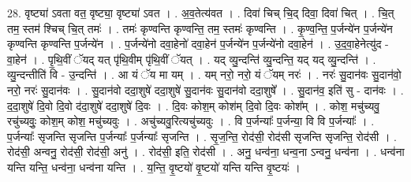 \documentclass[17pt]{extarticle}
\begin{document}
28. वृष्ट्या॑ ऽवता वत॒ वृष्ट्या॒ वृष्ट्या॑ ऽवत । . अ॒व॒तेत्य॑वत । . दिवा॑ चिच् चि॒द् दिवा॒ दिवा॑ चित् । . चि॒त् तम॒ स्तम॑ श्चिच् चि॒त् तमः॑ । . तमः॑ कृण्वन्ति कृण्वन्ति॒ तम॒ स्तमः॑ कृण्वन्ति । . कृ॒ण्व॒न्ति॒ प॒र्जन्ये॑न प॒र्जन्ये॑न कृण्वन्ति कृण्वन्ति प॒र्जन्ये॑न । . प॒र्जन्ये॑नो दवा॒हेनो॑ दवा॒हेन॑ प॒र्जन्ये॑न प॒र्जन्ये॑नो दवा॒हेन॑ । . उ॒द॒वा॒हेनेत्यु॑द - वा॒हेन॑ । . पृ॒थि॒वीं ॅयद् यत् पृ॑थि॒वीम् पृ॑थि॒वीं ॅयत् । . यद् व्यु॒न्दन्ति॑ व्यु॒न्दन्ति॒ यद् यद् व्यु॒न्दन्ति॑ । . व्यु॒न्दन्तीति॑ वि - उ॒न्दन्ति॑ । . आ यं ॅय मा यम् । . यम् नरो॒ नरो॒ यं ॅयम् नरः॑ । . नरः॑ सु॒दान॑वः सु॒दान॑वो॒ नरो॒ नरः॑ सु॒दान॑वः । . सु॒दान॑वो ददा॒शुषे॑ ददा॒शुषे॑ सु॒दान॑वः सु॒दान॑वो ददा॒शुषे᳚ । . सु॒दान॑व॒ इति॑ सु - दान॑वः । . द॒दा॒शुषे॑ दि॒वो दि॒वो द॑दा॒शुषे॑ ददा॒शुषे॑ दि॒वः । . दि॒वः कोश॒म् कोश॑म् दि॒वो दि॒वः कोश᳚म् । . कोश॒ मचु॑च्यवु॒ रचु॑च्यवुः॒ कोश॒म् कोश॒ मचु॑च्यवुः । . अचु॑च्यवु॒रित्यचु॑च्यवुः । . वि प॒र्जन्याः᳚ प॒र्जन्या॒ वि वि प॒र्जन्याः᳚ । . प॒र्जन्याः᳚ सृजन्ति सृजन्ति प॒र्जन्याः᳚ प॒र्जन्याः᳚ सृजन्ति । . सृ॒ज॒न्ति॒ रोद॑सी॒ रोद॑सी सृजन्ति सृजन्ति॒ रोद॑सी । . रोद॑सी॒ अन्वनु॒ रोद॑सी॒ रोद॑सी॒ अनु॑ । . रोद॑सी॒ इति॒ रोद॑सी । . अनु॒ धन्व॑ना॒ धन्व॒ना ऽन्वनु॒ धन्व॑ना । . धन्व॑ना यन्ति यन्ति॒ धन्व॑ना॒ धन्व॑ना यन्ति । . य॒न्ति॒ वृ॒ष्टयो॑ वृ॒ष्टयो॑ यन्ति यन्ति वृ॒ष्टयः॑ । \newline
\end{document}

